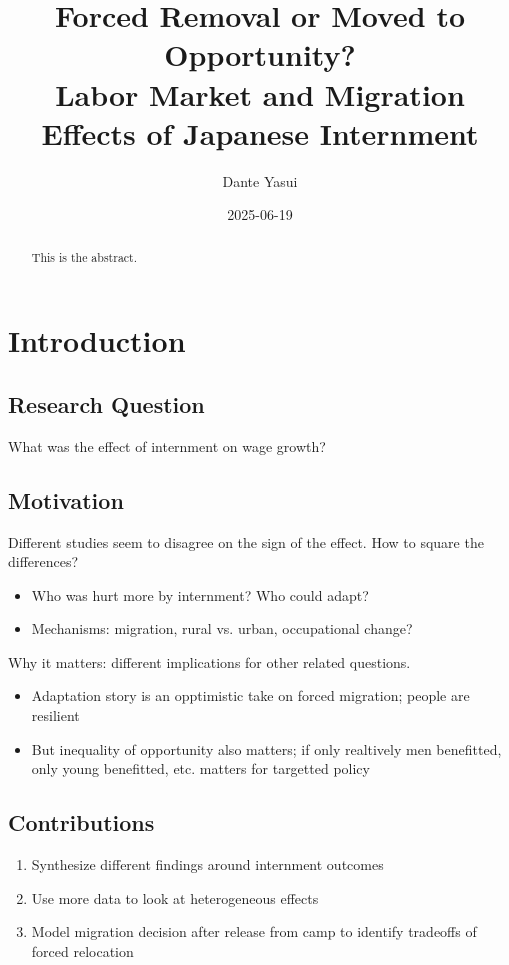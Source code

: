 \documentclass[a4paper,11pt]{article}
\author{Dante Yasui}
\date{2025-06-19}
\title{Forced Removal or Moved to Opportunity?\\\medskip
\large Labor Market and Migration Effects of Japanese Internment}
\begin{document}
\maketitle
\begin{abstract}

This is the abstract.

\end{abstract}
\setcounter{tocdepth}{3}
\tableofcontents

\section{Introduction}
\label{sec:org1bab5e6}
\subsection{Research Question}
\label{sec:org9e9f9a4}
What was the effect of internment on wage growth?
\subsection{Motivation}
\label{sec:orgf23d61b}
Different studies seem to disagree on the sign of the effect.
How to square the differences?
\begin{itemize}
\item Who was hurt more by internment? Who could adapt?
\item Mechanisms: migration, rural vs. urban, occupational change?
\end{itemize}

Why it matters: different implications for other related questions.
\begin{itemize}
\item Adaptation story is an opptimistic take on forced migration; people are resilient
\item But inequality of opportunity also matters; if only realtively men benefitted, only young benefitted, etc. matters for targetted policy
\end{itemize}
\subsection{Contributions}
\label{sec:org66a3dfb}
\begin{enumerate}
\item Synthesize different findings around internment outcomes
\item Use more data to look at heterogeneous effects
\item Model migration decision after release from camp to identify tradeoffs of forced relocation
\end{enumerate}
\end{document}
